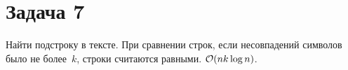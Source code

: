 \section{Задача 7}
Найти подстроку в тексте. При сравнении строк, если несовпадений символов было не более~$k$, строки считаются равными. $\mathcal{O}(nk \log n)$.
